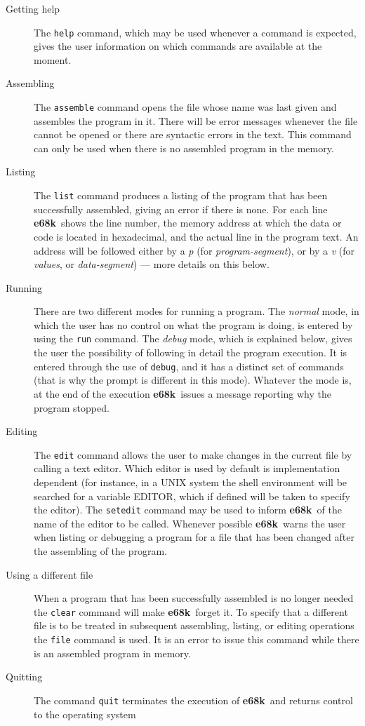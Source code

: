\documentclass[a4,11pt]{article}
\newcommand{\esek}{{\bf e68k}}
\newcommand{\comm}[1]{{\tt #1}}
\begin{document}
\begin{description}
\item[Getting help] The \comm{help} command, which may be used whenever
a command
is expected, gives the user information on which commands are
available at the moment.
\item[Assembling] The \comm{assemble} command opens the
file whose name was last given and assembles the program in it. There
will be error messages whenever the file cannot be opened or there
are syntactic errors in the text. This command can only be used when
there is no assembled program in the memory.
\item[Listing] The \comm{list} command produces a listing of the
program that has been successfully assembled, giving an error if there
is none. For each line \esek\    shows the line number, the memory
address at which the data or code is located in hexadecimal,
and the actual line in the program text. An address will
be followed either by a {\em p} (for {\em program-segment}), or by a
{\em v} (for {\em values}, or {\em data-segment}) --- more details on
this below. 
\item[Running] There are two different modes for running a
program. The {\em normal\/} mode, in which the user has no control
on what the program is doing, is entered by using the \comm{run}
command. The {\em debug} mode, which is explained
below, gives the user the possibility of
following in detail the program execution. It is entered through the
use of \comm{debug}, and it has a distinct set of commands (that is
why the prompt is different in this mode). Whatever the mode is,
at the end of the execution \esek\    issues a message reporting why the
program stopped.
\item[Editing] The \comm{edit} command allows the
user to make changes in the current file by calling a text editor. Which
editor is used by default is
implementation dependent (for instance, in a UNIX system
the shell environment will be searched for a variable EDITOR, which if
defined will be taken to specify the editor).
The \comm{setedit} command
may be used to inform \esek\    of the name of the editor to be called.
Whenever possible \esek\    warns the user when listing or debugging
a program for a file that has been changed after the assembling of
the program.
\item[Using a different file] When a program that has been successfully
assembled is no longer needed the \comm{clear} command will
make \esek\    forget it. To specify that a different file is to be treated
in subsequent assembling, listing, or editing operations
the \comm{file} command is used. It is an error to issue this command
while there is an assembled program in memory.
\item[Quitting] The command \comm{quit} terminates the execution of
\esek\    and returns control to the operating system 
\end{description}
\end{document}
